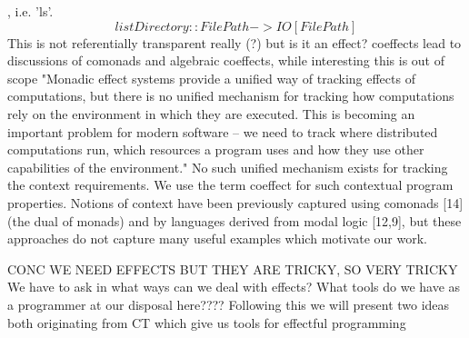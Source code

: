 , i.e. 'ls'.
$$listDirectory :: FilePath -> IO [FilePath]$$
This is not referentially transparent really (?)
but is it an effect?
coeffects lead to discussions of comonads and algebraic coeffects,
while interesting this is out of scope
"Monadic effect systems provide a unified way of tracking effects of computations, but there is no unified mechanism for tracking how computations rely on the environment in which they are executed. This is becoming an important problem for modern software – we need to track where distributed computations run, which resources a program uses and how they use other capabilities of the environment."
No such unified mechanism exists for tracking the context requirements. We use the term coeffect for such contextual program properties. Notions of context have been previously captured using comonads [14] (the dual of monads) and by languages derived from modal logic [12,9], but these approaches do not capture many useful examples which motivate our work.

\cite{coeffects-icalp13}
\cite{petricek2014coeffects}



CONC WE NEED EFFECTS BUT THEY ARE TRICKY, SO VERY TRICKY
We have to ask in what ways can we deal with effects?
What tools do we have as a programmer at our disposal here????
Following this we will present two ideas both originating from CT
which give us tools for effectful programming
